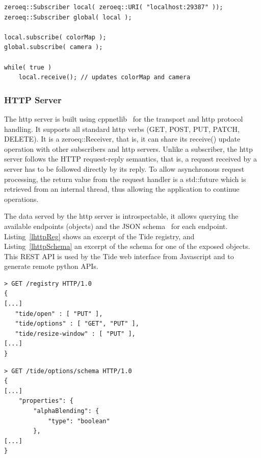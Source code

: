 \documentclass[10pt]{llncs}
\newcommand{\lref}[1]{Listing~\ref{#1}}
\begin{document}
\begin{lstlisting}[float,caption=Subscriber Sharing, label=lSubShare]
zeroeq::Subscriber local( zeroeq::URI( "localhost:29387" ));
zeroeq::Subscriber global( local );

local.subscribe( colorMap );
global.subscribe( camera );

while( true )
    local.receive(); // updates colorMap and camera
\end{lstlisting}

\subsubsection{HTTP Server}

The http server is built using cppnetlib~\cite{cppnetlib} for the transport and
http protocol handling. It supports all standard http verbs (GET, POST, PUT,
PATCH, DELETE). It is a \textsf{zeroeq::Receiver}, that is, it can share its
\textsf{receive()} update operation with other subscribers and http servers.
Unlike a subscriber, the http server follows the HTTP request-reply semantics,
that is, a request received by a server has to be followed directly by its
reply. To allow asynchronous request processing, the return value from the
request handler is a \textsf{std::future} which is retrieved from an internal
thread, thus allowing the application to continue operations.

The data served by the http server is introspectable, it allows querying the
available endpoints (objects) and the JSON schema~\cite{jsonschema} for each
endpoint. \lref{lhttpReg} shows an excerpt of the Tide registry, and
\lref{lhttpSchema} an excerpt of the schema for one of the exposed objects. This
REST API is used by the Tide web interface from Javascript and to generate
remote python APIs.

\noindent\begin{minipage}[b][][b]{.48\textwidth}
\begin{lstlisting}[caption=HTTP Server Registry, label=lhttpReg]
> GET /registry HTTP/1.0
{
[...]
   "tide/open" : [ "PUT" ],
   "tide/options" : [ "GET", "PUT" ],
   "tide/resize-window" : [ "PUT" ],
[...]
}
\end{lstlisting}
\end{minipage}\hfill
\begin{minipage}[b][][b]{.48\textwidth}
\begin{lstlisting}[caption=Object JSON Schema, label=lhttpSchema]
> GET /tide/options/schema HTTP/1.0
{
[...]
    "properties": {
        "alphaBlending": {
            "type": "boolean"
        },
[...]
}
\end{lstlisting}
\end{minipage}
\end{document}
